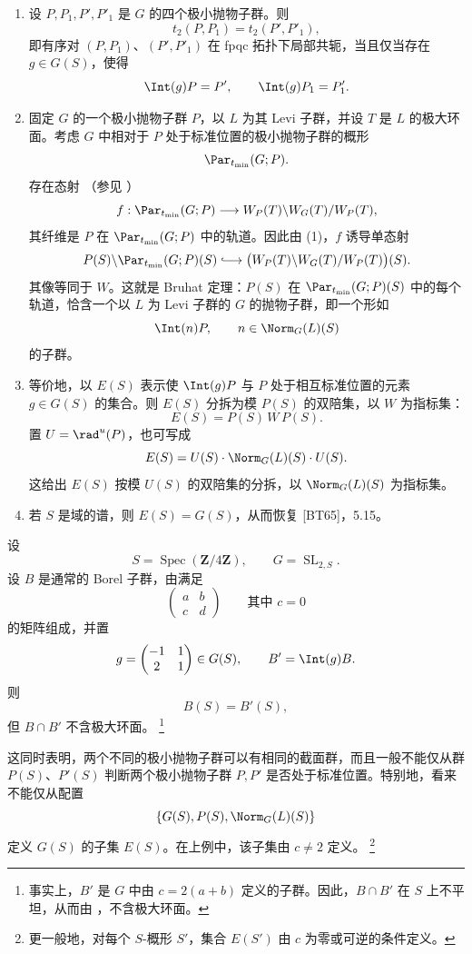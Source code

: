 \begin{enumerate}[label=\textup{(\arabic*)}]
\item 设 \(P,P_1,P',P'_1\) 是 \(G\) 的四个极小抛物子群。则
\[
 t_2(P,P_1)=t_2(P',P'_1),
\]
即有序对 \((P,P_1)\)、\((P',P'_1)\) 在 fpqc 拓扑下局部共轭，当且仅当存在 \(g\in G(S)\)，使得
\[
 \Int(g)P=P',\qquad \Int(g)P_1=P'_1.
\]

\item 固定 \(G\) 的一个极小抛物子群 \(P\)，以 \(L\) 为其 Levi 子群，并设 \(T\) 是 \(L\) 的极大环面。考虑 \(G\) 中相对于 \(P\) 处于标准位置的极小抛物子群的概形
\[
 \Par_{t_{\min}}(G;P).
\]
存在态射 \textup{（参见 ）}
\[
 f:\Par_{t_{\min}}(G;P)
   \longrightarrow W_P(T)\backslash W_G(T)/W_P(T),
\]
其纤维是 \(P\) 在 \(\Par_{t_{\min}}(G;P)\) 中的轨道。因此由 \textup{(1)}，\(f\) 诱导单态射
\[
 P(S)\backslash\Par_{t_{\min}}(G;P)(S)
 \lhook\joinrel\longrightarrow
 \bigl(W_P(T)\backslash W_G(T)/W_P(T)\bigr)(S).
\]
其像等同于 \(W\)。这就是 Bruhat 定理：\(P(S)\) 在 \(\Par_{t_{\min}}(G;P)(S)\) 中的每个轨道，恰含一个以 \(L\) 为 Levi 子群的 \(G\) 的抛物子群，即一个形如
\[
 \Int(n)P,\qquad n\in\Norm_G(L)(S)
\]
的子群。

\item 等价地，以 \(E(S)\) 表示使 \(\Int(g)P\) 与 \(P\) 处于相互标准位置的元素 \(g\in G(S)\) 的集合。则 \(E(S)\) 分拆为模 \(P(S)\) 的双陪集，以 \(W\) 为指标集：
\[
 E(S)=P(S)\,W\,P(S).
\]
置 \(U=\rad^u(P)\)，也可写成
\[
 E(S)=U(S)\cdot\Norm_G(L)(S)\cdot U(S).
\]
这给出 \(E(S)\) 按模 \(U(S)\) 的双陪集的分拆，以 \(\Norm_G(L)(S)\) 为指标集。

\item 若 \(S\) 是域的谱，则 \(E(S)=G(S)\)，从而恢复 \textup{[BT65]}，5.15。
\end{enumerate}

\begin{sgastatement}{}
设
\[
 S=\operatorname{Spec}(\mathbf Z/4\mathbf Z),
 \qquad G=\operatorname{SL}_{2,S}.
\]
设 \(B\) 是通常的 Borel 子群，由满足
\[
 \begin{pmatrix}a&b\\c&d\end{pmatrix}
 \qquad\text{其中 }c=0
\]
的矩阵组成，并置
\[
 g=\begin{pmatrix}-1&1\\2&1\end{pmatrix}\in G(S),
 \qquad B'=\Int(g)B.
\]
则
\[
 B(S)=B'(S),
\]
但 \(B\cap B'\) 不含极大环面。
\footnote{事实上，\(B'\) 是 \(G\) 中由 \(c=2(a+b)\) 定义的子群。因此，\(B\cap B'\) 在 \(S\) 上不平坦，从而由 ，不含极大环面。}

这同时表明，两个不同的极小抛物子群可以有相同的截面群，而且一般不能仅从群 \(P(S)\)、\(P'(S)\) 判断两个极小抛物子群 \(P,P'\) 是否处于标准位置。特别地，看来不能仅从配置
\[
 \{G(S),P(S),\Norm_G(L)(S)\}
\]
定义 \(G(S)\) 的子集 \(E(S)\)。在上例中，该子集由 \(c\ne2\) 定义。
\footnote{更一般地，对每个 \(S\)-概形 \(S'\)，集合 \(E(S')\) 由 \(c\) 为零或可逆的条件定义。}
\end{sgastatement}

